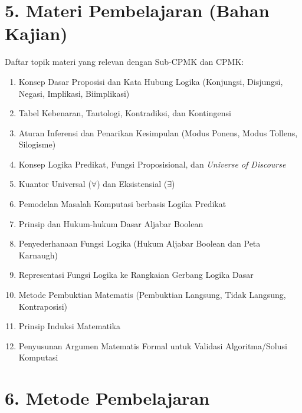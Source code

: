 \documentclass[12pt,a4paper]{article}
\begin{document}
\vspace{0.5cm}

\section*{5. Materi Pembelajaran (Bahan Kajian)}

Daftar topik materi yang relevan dengan Sub-CPMK dan CPMK:

\begin{enumerate}[leftmargin=*]
  \item Konsep Dasar Proposisi dan Kata Hubung Logika (Konjungsi, Disjungsi, Negasi, Implikasi, Biimplikasi)
  \item Tabel Kebenaran, Tautologi, Kontradiksi, dan Kontingensi
  \item Aturan Inferensi dan Penarikan Kesimpulan (Modus Ponens, Modus Tollens, Silogisme)
  \item Konsep Logika Predikat, Fungsi Proposisional, dan \textit{Universe of Discourse}
  \item Kuantor Universal ($\forall$) dan Eksistensial ($\exists$)
  \item Pemodelan Masalah Komputasi berbasis Logika Predikat
  \item Prinsip dan Hukum-hukum Dasar Aljabar Boolean
  \item Penyederhanaan Fungsi Logika (Hukum Aljabar Boolean dan Peta Karnaugh)
  \item Representasi Fungsi Logika ke Rangkaian Gerbang Logika Dasar
  \item Metode Pembuktian Matematis (Pembuktian Langsung, Tidak Langsung, Kontraposisi)
  \item Prinsip Induksi Matematika
  \item Penyusunan Argumen Matematis Formal untuk Validasi Algoritma/Solusi Komputasi
\end{enumerate}

\vspace{0.5cm}

\section*{6. Metode Pembelajaran}
\end{document}
